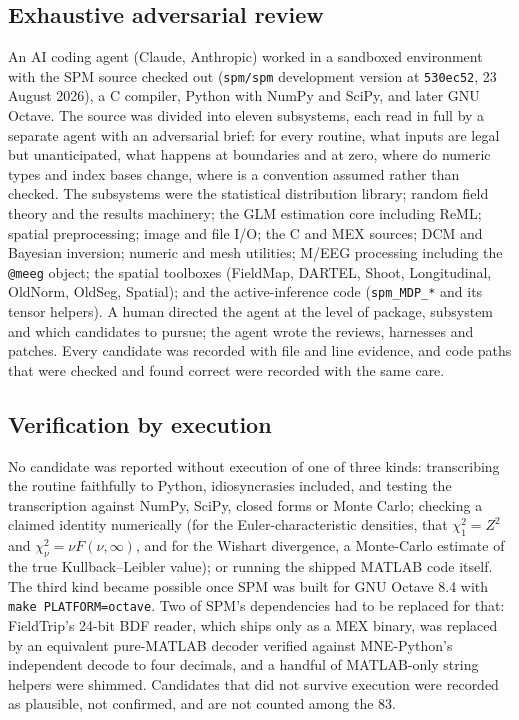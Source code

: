 \documentclass[11pt]{article}
\newcommand{\code}[1]{\texttt{#1}}
\begin{document}
\subsection{Exhaustive adversarial review}
An AI coding agent (Claude, Anthropic) worked in a sandboxed environment with the SPM source checked out (\code{spm/spm} development version at \code{530ec52}, 23 August 2026), a C compiler, Python with NumPy and SciPy, and later GNU Octave. The source was divided into eleven subsystems, each read in full by a separate agent with an adversarial brief: for every routine, what inputs are legal but unanticipated, what happens at boundaries and at zero, where do numeric types and index bases change, where is a convention assumed rather than checked. The subsystems were the statistical distribution library; random field theory and the results machinery; the GLM estimation core including ReML; spatial preprocessing; image and file I/O; the C and MEX sources; DCM and Bayesian inversion; numeric and mesh utilities; M/EEG processing including the \code{@meeg} object; the spatial toolboxes (FieldMap, DARTEL, Shoot, Longitudinal, OldNorm, OldSeg, Spatial); and the active-inference code (\code{spm\_MDP\_*} and its tensor helpers). A human directed the agent at the level of package, subsystem and which candidates to pursue; the agent wrote the reviews, harnesses and patches. Every candidate was recorded with file and line evidence, and code paths that were checked and found correct were recorded with the same care.

\subsection{Verification by execution}
No candidate was reported without execution of one of three kinds: transcribing the routine faithfully to Python, idiosyncrasies included, and testing the transcription against NumPy, SciPy, closed forms or Monte Carlo; checking a claimed identity numerically (for the Euler-characteristic densities, that $\chi^2_1 = Z^2$ and $\chi^2_\nu = \nu F(\nu,\infty)$, and for the Wishart divergence, a Monte-Carlo estimate of the true Kullback--Leibler value); or running the shipped MATLAB code itself. The third kind became possible once SPM was built for GNU Octave 8.4 with \code{make PLATFORM=octave}. Two of SPM's dependencies had to be replaced for that: FieldTrip's 24-bit BDF reader, which ships only as a MEX binary, was replaced by an equivalent pure-MATLAB decoder verified against MNE-Python's independent decode to four decimals, and a handful of MATLAB-only string helpers were shimmed. Candidates that did not survive execution were recorded as plausible, not confirmed, and are not counted among the 83.
\end{document}
